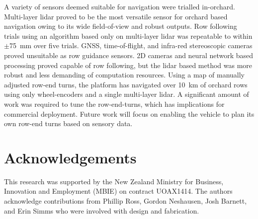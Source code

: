 \documentclass[preprint,authoryear,12pt]{elsarticle}
\begin{document}
    A variety of sensors deemed suitable for navigation were trialled in-orchard.
    Multi-layer lidar proved to be the most versatile sensor for orchard based navigation owing to its wide field-of-view and robust outputs.
    Row following trials using an algorithm based only on multi-layer lidar was repeatable to within $\pm$\SI{75}{\milli\meter} over five trials.
    GNSS, time-of-flight, and infra-red stereoscopic cameras proved unsuitable as row guidance sensors.
    2D cameras and neural network based processing proved capable of row following, but the lidar based method was more robust and less demanding of computation resources.
    Using a map of manually adjusted row-end turns, the platform has navigated over \SI{10}{\kilo\meter} of orchard rows using only wheel-encoders and a single multi-layer lidar.
    A significant amount of work was required to tune the row-end-turns, which has implications for commercial deployment.
    Future work will focus on enabling the vehicle to plan its own row-end turns based on sensory data.

\section*{Acknowledgements}
This research was supported by the New Zealand Ministry for Business, Innovation and Employment (MBIE) on contract UOAX1414.
The authors acknowledge contributions from Phillip Ross, Gordon Neshausen, Josh Barnett, and Erin Simms who were involved with design and fabrication.



\end{document}
